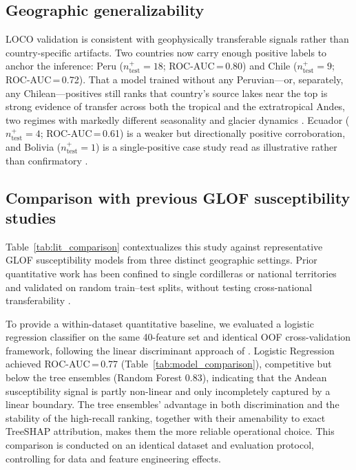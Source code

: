 \documentclass[pdflatex,sn-basic]{sn-jnl}%
\begin{document}
\subsection{Geographic generalizability}

LOCO validation is consistent with geophysically transferable signals rather
than country-specific artifacts. Two countries now carry enough positive
labels to anchor the inference: Peru ($n^+_\text{test}\!=\!18$;
ROC-AUC\,=\,0.80) and Chile ($n^+_\text{test}\!=\!9$; ROC-AUC\,=\,0.72).
That a model trained without any Peruvian---or, separately, any
Chilean---positives still ranks that country's source lakes near the top
is strong evidence of transfer across both the tropical and the
extratropical Andes, two regimes with markedly different seasonality and
glacier dynamics \citep{Masiokas2020,Vuille2018}. Ecuador
($n^+_\text{test}\!=\!4$; ROC-AUC\,=\,0.61) is a weaker but directionally
positive corroboration, and Bolivia ($n^+_\text{test}\!=\!1$) is a
single-positive case study read as illustrative rather than confirmatory
\citep{Gariano2016,Francou2003}.

\subsection{Comparison with previous GLOF susceptibility studies}

Table~\ref{tab:lit_comparison} contextualizes this study against
representative GLOF susceptibility models from three distinct
geographic settings. Prior quantitative work has been confined to
single cordilleras or national territories and validated on random
train--test splits, without testing cross-national transferability
\citep{McKillop2007,Rounce2017,Emmer2020,IribarrenAnacona2014,
Pronk2022}.

To provide a within-dataset quantitative baseline, we evaluated
a logistic regression classifier on the same 40-feature set and
identical OOF cross-validation framework, following the linear
discriminant approach of \citet{McKillop2007}.
Logistic Regression achieved ROC-AUC\,=\,0.77 (Table~\ref{tab:model_comparison}),
competitive but below the tree ensembles (Random Forest 0.83),
indicating that the Andean susceptibility signal is partly non-linear and
only incompletely captured by a linear boundary. The tree ensembles'
advantage in both discrimination and the stability of the high-recall
ranking, together with their amenability to exact TreeSHAP attribution,
makes them the more reliable operational choice.
This comparison is conducted on an identical dataset and evaluation
protocol, controlling for data and feature engineering effects.
\end{document}
